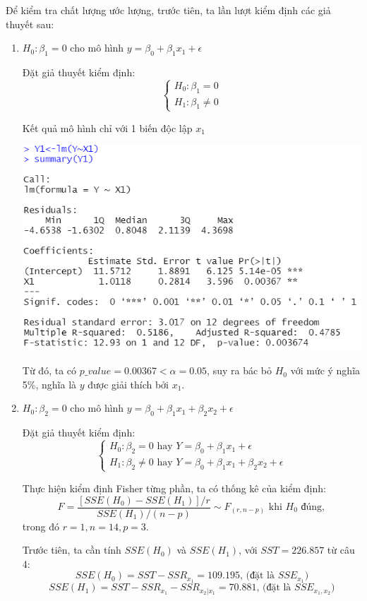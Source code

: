\documentclass[a4paper]{article}
\theoremstyle{nonumberplain}
\begin{document}
Để kiểm tra chất lượng ước lượng, trước tiên, ta lần lượt kiểm định các giả thuyết sau:
\begin{enumerate}[label=(\roman*)]
	\item $H_0: \beta_1 = 0$ cho mô hình $y = \beta_0 + \beta_1x_1 + \epsilon$
	
	Đặt giả thuyết kiểm định:
	\[\begin{cases}
		H_0 : \beta_1 = 0\\
		H_1 : \beta_1 \ne 0
	\end{cases}\]

	Kết quả mô hình chỉ với 1 biến độc lập $x_1$
	\begin{center}
		\includegraphics{bai3_10.PNG} 
	\end{center}
	
	Từ đó, ta có $p\_value = 0.00367 < \alpha = 0.05$, suy ra bác bỏ $H_0$ với mức ý nghĩa 5\%, nghĩa là $y$ được giải thích bởi $x_1$.
	
	\item $H_0: \beta_2 = 0$ cho mô hình $y = \beta_0 + \beta_1x_1 + \beta_2x_2 + \epsilon$
	
	Đặt giả thuyết kiểm định:
	\[\begin{cases}
		H_0 : \beta_2 = 0 \text{ hay } Y = \beta_0 + \beta_1 x_1 + \epsilon \\
		H_1 : \beta_2 \ne 0 \text{ hay } Y = \beta_0 + \beta_1 x_1 + \beta_2 x_2 + \epsilon
	\end{cases}\]
	
	Thực hiện kiểm định Fisher từng phần, ta có thống kê của kiểm định: 
	$$F = \displaystyle \frac{\left [ SSE (H_0) - SSE(H_1) \right ] / r}{SSE(H_1)/(n-p)} \sim F_{(r,n-p)} \text{ khi } H_0 \text{ đúng},$$
	trong đó $r = 1, n = 14, p = 3$.
	
	Trước tiên, ta cần tính $SSE (H_0)$ và $SSE(H_1)$, với $SST = 226.857$ từ câu 4:
	$$SSE(H_0) = SST - SSR_{x_1} = 109.195 \text{, (đặt là } SSE_{x_1})$$
	$$SSE(H_1) = SST - SSR_{x_1} - SSR_{x_2|x_1} = 70.881 \text{, (đặt là }  SSE_{x_1,x_2})$$
	

\end{enumerate}
\end{document}

